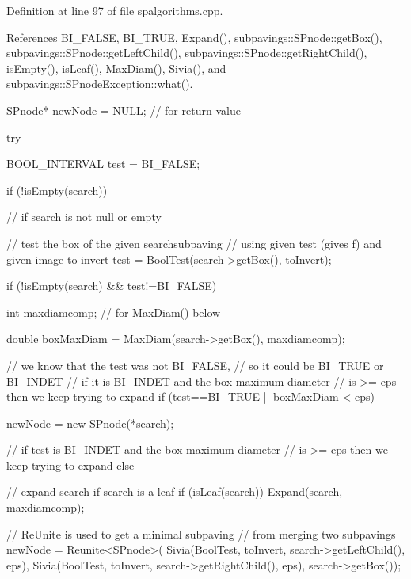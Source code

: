 \-Definition at line 97 of file spalgorithms.\-cpp.



\-References \-B\-I\-\_\-\-F\-A\-L\-S\-E, \-B\-I\-\_\-\-T\-R\-U\-E, \-Expand(), subpavings\-::\-S\-Pnode\-::get\-Box(), subpavings\-::\-S\-Pnode\-::get\-Left\-Child(), subpavings\-::\-S\-Pnode\-::get\-Right\-Child(), is\-Empty(), is\-Leaf(), \-Max\-Diam(), \-Sivia(), and subpavings\-::\-S\-Pnode\-Exception\-::what().


\begin{DoxyCode}
    {
        SPnode* newNode = NULL;  // for return value

        try {
            BOOL_INTERVAL test = BI_FALSE;

            if (!isEmpty(search)) { // if search is not null or empty

                // test the box of the given searchsubpaving
                // using given test (gives f) and given image to invert
                test = BoolTest(search->getBox(), toInvert);
            }

            if (!isEmpty(search) && test!=BI_FALSE) {

                int maxdiamcomp; // for MaxDiam() below

                double boxMaxDiam = MaxDiam(search->getBox(), maxdiamcomp);

                // we know that the test was not BI_FALSE,
                // so it could be BI_TRUE or BI_INDET
                // if it is BI_INDET and the box maximum diameter
                // is >= eps then we keep trying to expand
                if (test==BI_TRUE || boxMaxDiam < eps) {

                    newNode = new SPnode(*search);
                }

                // if test is BI_INDET and the box maximum diameter
                // is >= eps then we keep trying to expand
                else  {

                    // expand search if search is a leaf
                    if (isLeaf(search)) Expand(search,
                                            maxdiamcomp);

                    // ReUnite is used to get a minimal subpaving
                    // from merging two subpavings
                    newNode = Reunite<SPnode>(
                                Sivia(BoolTest, toInvert,
                                search->getLeftChild(), eps),
                            Sivia(BoolTest, toInvert,
                            search->getRightChild(), eps),
                                            search->getBox());
                }


}}}
\end{DoxyCode}
